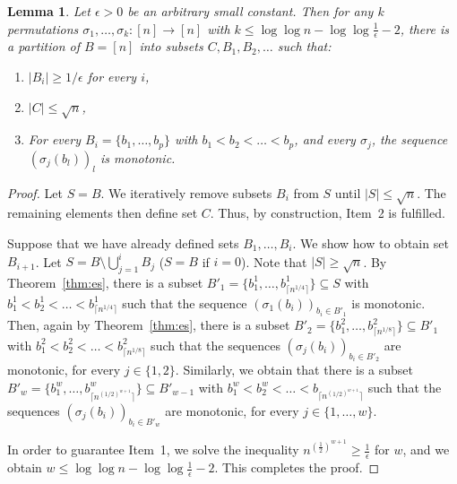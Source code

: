 \documentclass[a4paper]{article}
\newtheorem{lemma}{Lemma}
\begin{document}
\begin{lemma} \label{lem:decomp}
Let $\epsilon > 0$ be an arbitrary small constant. Then for any $k$ permutations
$\sigma_1, \dots, \sigma_k: [n] \rightarrow [n]$ with
$k \le \log \log n - \log \log \frac{1}{\epsilon} -2$,
there is a partition of $B = [n]$ into subsets $C, B_1, B_2, \dots$ such that:
\begin{enumerate}
 \item $|B_i| \ge 1/\epsilon$ for every $i$,
 \item $|C| \le \sqrt{n}$,
 \item For every $B_i = \{b_1, \dots, b_p \}$ with $b_1 < b_2 < \dots < b_p$, and every $\sigma_j$, the sequence
$(\sigma_j(b_l))_l$ is monotonic.
\end{enumerate}
\end{lemma}
\begin{proof}
 Let $S = B$. We iteratively remove subsets $B_i$ from $S$ until $|S| \le \sqrt{n}$. The remaining elements then define
 set $C$. Thus, by construction, Item~2 is fulfilled.


 Suppose that we have already defined sets $B_1, \dots, B_i$. We show how to obtain set $B_{i+1}$.
 Let $S = B \setminus \bigcup_{j=1}^i B_j$ ($S=B$ if $i=0$). Note that $|S| \ge \sqrt{n}$.
 By Theorem~\ref{thm:es}, there is a
 subset $B'_1 = \{b^1_1, \dots, b^1_{\lceil n^{1/4} \rceil} \} \subseteq S$
 with $b^1_1 < b^1_2 < \dots < b^1_{\lceil n^{1/4} \rceil }$ such that the sequence
 $(\sigma_1(b_i))_{b_i \in B'_1}$ is monotonic. Then, again by Theorem~\ref{thm:es}, there is
 a subset $B'_2 = \{b^2_1, \dots, b^2_{ \lceil n^{1/8} \rceil } \} \subseteq B'_1$ with $b^2_1 < b^2_2 < \dots < b^2_{\lceil n^{1/8} \rceil }$
 such that the sequences $(\sigma_j(b_i))_{b_i \in B'_2}$ are monotonic, for every $j \in \{1,2\}$. Similarly,
 we obtain that there is a subset $B'_{w} = \{b^w_1, \dots,  b^w_{\lceil n^{ (1/2)^{w+1} }\rceil} \} \subseteq B'_{w-1}$ with
 $b^w_1 < b^w_2 < \dots < b_{\lceil n^{ (1/2)^{w+1} } \rceil }$ such that the sequences
 $(\sigma_j(b_i))_{b_i \in B'_w}$ are monotonic, for every $j \in \{1, \dots, w\}$.

 In order to guarantee Item~1, we solve the inequality
 $n^{ (\frac{1}{2})^{w+1}} \ge \frac{1}{\epsilon}$
for $w$, and we obtain $w \le \log \log n - \log \log \frac{1}{\epsilon} -2$. This completes the proof.
\end{proof}
\end{document}

